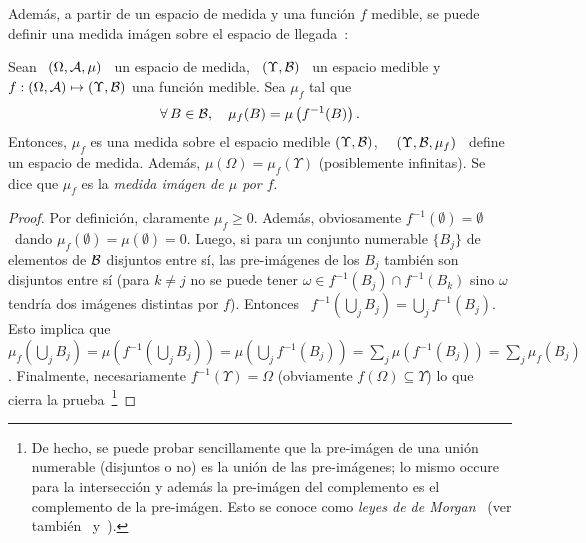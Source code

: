 Adem\'as, a partir de un espacio de medida y una funci\'on $f$ medible, se puede
definir una medida im\'agen  sobre el espacio de llegada~\cite{AthLah06, Bog07:v1,
  Coh13}:
%
\begin{teorema}\label{Th:MP:MedidaImagen}
  Sean  \ $(\Omega,\mathcal{A},\mu)$  \  un espacio  de  medida, \  $(\Upsilon,\mathcal{B})$ \  un
  espacio  medible  y  $f:  (\Omega,\mathcal{A})  \mapsto  (\Upsilon,\mathcal{B})$  una  funci\'on
  medible. Sea $\mu_f$ tal que
  \[
  \forall \,  B \in  \mathcal{B}, \quad  \mu_f(B) = \mu\left( f^{-1}(B) \right).
  \]
  Entonces, $\mu_f$  es una medida  sobre el espacio medible  $(\Upsilon,\mathcal{B})$, \
  \ie  \  $(\Upsilon,\mathcal{B},\mu_f)$  \  define  un  espacio  de  medida.   Adem\'as,
  $\mu(\Omega) = \mu_f(\Upsilon)$ (posiblemente  infinitas). Se dice que $\mu_f$
  es la {\it medida im\'agen de $\mu$ por $f$}.
\end{teorema}
%
\begin{proof}
  Por   definici\'on,  claramente   $\mu_f  \ge   0$.    Adem\'as,  obviosamente
  $f^{-1}(\emptyset) =  \emptyset$ \ dando $\mu_f(\emptyset)  = \mu(\emptyset) =
  0$.  Luego,  si para un  conjunto numerable $\{  B_j \}$ de elementos  de $\mathcal{B}$
  disjuntos entre s\'i, las pre-im\'agenes  de los $B_j$ tambi\'en son disjuntos
  entre s\'i  (para $k  \ne j$ no  se puede  tener $\omega \in  f^{-1}(B_j) \cap
  f^{-1}(B_k)$  sino  $\omega$  tendr\'ia  dos im\'agenes  distintas  por  $f$).
  Entonces \ $f^{-1}\left( \bigcup_j B_j \right) = \bigcup_j f^{-1}(B_j)$.  Esto
  implica  que \  $\mu_f\left( \bigcup_j  B_j \right)  =  \mu\left( f^{-1}\left(
      \bigcup_j B_j \right) \right)  = \mu\left( \bigcup_j f^{-1}(B_j) \right) =
  \sum_j  \mu\left(  f^{-1}(B_j)  \right)  =  \sum_j  \mu_f(B_j)$.   Finalmente,
  necesariamente  $f^{-1}(\Upsilon) =  \Omega$ (obviamente  $f(\Omega) \subseteq
  \Upsilon$)  lo  que  cierra  la  prueba~\footnote{De hecho,  se  puede  probar
    sencillamente que la pre-im\'agen de  una uni\'on numerable (disjuntos o no)
    es la uni\'on de las  pre-im\'agenes; lo mismo occure para la intersecci\'on
    y  adem\'as  la  pre-im\'agen  del  complemento  es  el  complemento  de  la
    pre-im\'agen.  Esto se conoce  como {\it leyes de de Morgan}~\cite{AthLah06,
      Coh13,        HogMck13}       (ver       tambi\'en~\cite[Cap.~1]{KolFom57}
    y~\cite[Caps.~5~\&~6]{KolFom61}).\label{Foot:MP:Jacobiana}}
\end{proof}

